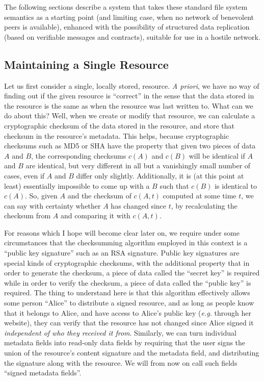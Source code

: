 \documentclass[11pt]{article}
\begin{document}
\begin{mainmatter}
The following sections describe a system that takes these standard file system semantics as a starting point (and limiting case, when no network of benevolent peers is available), enhanced with the possibility of structured data replication (based on verifiable messages and contracts), suitable for use in a hostile network.

\subsection{Maintaining a Single Resource}
\label{maintain}

Let us first consider a single, locally stored, resource. \emph{A priori}, we have no way of finding out if the given resource is ``correct'' in the sense that the data stored in the resource is the same as when the resource was last written to. What can we do about this? Well, when we create or modify that resource, we can calculate a cryptographic checksum of the data stored in the resource, and store that checksum in the resource's metadata. This helps, because cryptographic checksums such as MD5 or SHA have the property that given two pieces of data $A$ and $B$, the corresponding checksums $c(A)$ and $c(B)$ will be identical if $A$ and $B$ are identical, but very different in all but a vanishingly small number of cases, even if $A$ and $B$ differ only slightly. Additionally, it is (at this point at least) essentially impossible to come up with a $B$ such that $c(B)$ is identical to $c(A)$. So, given $A$ and the checksum of $c(A, t)$ computed at some time $t$, we can say with certainty whether $A$ has changed since $t$, by recalculating the checksum from $A$ and comparing it with $c(A,t)$.

For reasons which I hope will become clear later on, we require under some circumstances that the checksumming algorithm employed in this context is a ``public key signature'' such as an RSA signature. Public key signatures are special kinds of cryptographic checksums, with the additional property that in order to generate the checksum, a piece of data called the ``secret key'' is required while in order to verify the checksum, a piece of data called the ``public key'' is required. The thing to understand here is that this algorithm effectively allows some person ``Alice'' to distribute a signed resource, and as long as people know that it belongs to Alice, and have access to Alice's public key (\emph{e.g.} through her website), they can verify that the resource has not changed since Alice signed it \emph{independent of who they received it from}. Similarly, we can turn individual metadata fields into read-only data fields by requiring that the user signs the union of the resource's content signature and the metadata field, and distributing the signature along with the resource. We will from now on call such fields ``signed metadata fields''.


\end{mainmatter}
\end{document}

